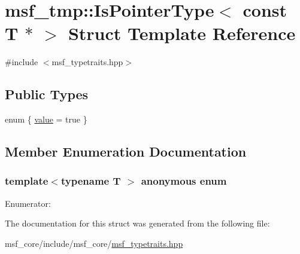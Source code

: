 \hypertarget{structmsf__tmp_1_1IsPointerType_3_01const_01T_01_5_01_4}{\section{msf\-\_\-tmp\-:\-:Is\-Pointer\-Type$<$ const T $\ast$ $>$ Struct Template Reference}
\label{structmsf__tmp_1_1IsPointerType_3_01const_01T_01_5_01_4}
}


{\ttfamily \#include $<$msf\-\_\-typetraits.\-hpp$>$}

\subsection*{Public Types}
\begin{DoxyCompactItemize}
\item 
enum \{ \hyperlink{structmsf__tmp_1_1IsPointerType_3_01const_01T_01_5_01_4_a38756a8a0abddeb4f522af1c062c0b43a30cd53fda0de19c53837302ad8497f95}{value} =  true
 \}
\end{DoxyCompactItemize}


\subsection{Member Enumeration Documentation}
\hypertarget{structmsf__tmp_1_1IsPointerType_3_01const_01T_01_5_01_4_a38756a8a0abddeb4f522af1c062c0b43}{\subsubsection[{anonymous enum}]{\setlength{\rightskip}{0pt plus 5cm}template$<$typename T $>$ anonymous enum}}\label{structmsf__tmp_1_1IsPointerType_3_01const_01T_01_5_01_4_a38756a8a0abddeb4f522af1c062c0b43}
\begin{Desc}
\item[Enumerator\-: ]\par
\begin{description}
\item[{\em 
\hypertarget{structmsf__tmp_1_1IsPointerType_3_01const_01T_01_5_01_4_a38756a8a0abddeb4f522af1c062c0b43a30cd53fda0de19c53837302ad8497f95}{value}\label{structmsf__tmp_1_1IsPointerType_3_01const_01T_01_5_01_4_a38756a8a0abddeb4f522af1c062c0b43a30cd53fda0de19c53837302ad8497f95}
}]\end{description}
\end{Desc}



The documentation for this struct was generated from the following file\-:\begin{DoxyCompactItemize}
\item 
msf\-\_\-core/include/msf\-\_\-core/\hyperlink{msf__typetraits_8hpp}{msf\-\_\-typetraits.\-hpp}\end{DoxyCompactItemize}
